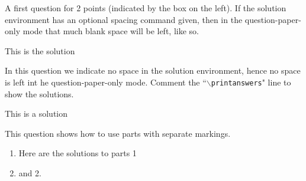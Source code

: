 \documentclass[a4paper,11pt,addpoints]{exam}
\begin{document}
\begin{questions}
\question[2] 
A first question for 2 points (indicated by the box on the left). If the solution environment has an optional spacing command given, then in the question-paper-only mode that much blank space will be left, like so.

\begin{solution}[1in]
This is the solution
\end{solution}

\question[1]
In this question we indicate no space in the solution environment, hence no space is left int he question-paper-only mode. Comment the ``{\tt{$\backslash$printanswers}}" line to show the solutions.

\begin{solution}
This is a solution
\end{solution}

\question
This question shows how to use parts with separate markings.

\begin{solution}
\begin{enumerate}
    \item Here are the solutions to parts 1
    \item and 2.
\end{enumerate}

\end{solution}

\end{questions}
\end{document}
